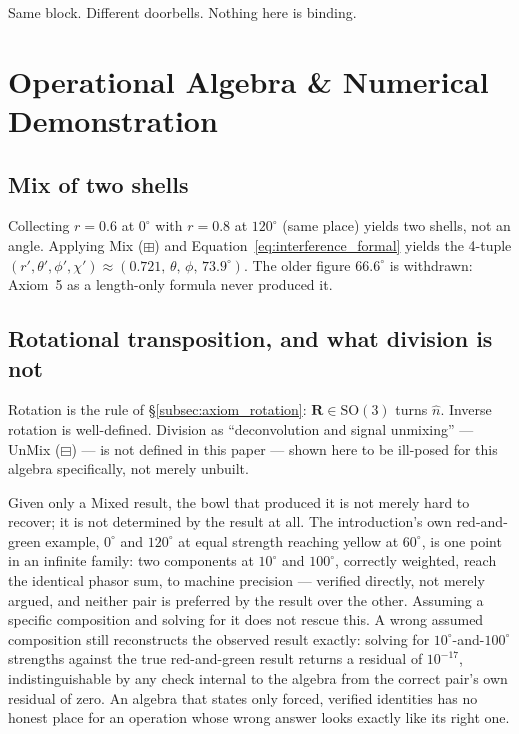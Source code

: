\documentclass[12pt, a4paper]{article}
\begin{document}
Same block. Different doorbells. Nothing here is binding.

\section{Operational Algebra \& Numerical Demonstration}

\subsection{Mix of two shells}
Collecting $r=0.6$ at $0^\circ$ with $r=0.8$ at $120^\circ$ (same
place) yields two shells, not an angle. Applying Mix ($\boxplus$) and
Equation~\eqref{eq:interference_formal} yields the 4-tuple
$(r',\theta',\phi',\chi')\approx(0.721,\,\theta,\,\phi,\,73.9^\circ)$.
The older figure $66.6^\circ$ is withdrawn: Axiom~5 as a length-only
formula never produced it.

\subsection{Rotational transposition, and what division is not}
\label{sec:unmixing}
\label{subsec:division_open}
Rotation is the rule of \S\ref{subsec:axiom_rotation}: $\mathbf{R}\in\mathrm{SO}(3)$
turns $\hat n$. Inverse rotation is well-defined. Division as
``deconvolution and signal unmixing'' --- UnMix ($\boxminus$) --- is
not defined in this paper --- shown here to be ill-posed for this
algebra specifically, not merely unbuilt.

Given only a Mixed result, the bowl that produced it is not merely
hard to recover; it is not determined by the result at all. The
introduction's own red-and-green example, $0^\circ$ and $120^\circ$
at equal strength reaching yellow at $60^\circ$, is one point in an
infinite family: two components at $10^\circ$ and $100^\circ$,
correctly weighted, reach the identical phasor sum, to machine
precision --- verified directly, not merely argued, and neither pair
is preferred by the result over the other. Assuming a specific
composition and solving for it does not rescue this. A wrong assumed
composition still reconstructs the observed result exactly: solving
for $10^\circ$-and-$100^\circ$ strengths against the true
red-and-green result returns a residual of $10^{-17}$, indistinguishable
by any check internal to the algebra from the correct pair's own
residual of zero. An algebra that states only forced, verified
identities has no honest place for an operation whose wrong answer
looks exactly like its right one.
\end{document}

